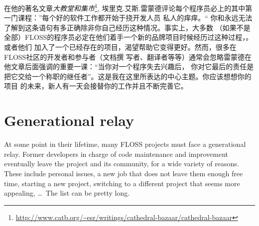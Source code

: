 

\noindent{}在他的著名文章\textit{大教堂和集市}\footnote{\url{
http://www.catb.org/~esr/writings/cathedral-bazaar/cathedral-bazaar}}, 
埃里克.艾斯.雷蒙德评论每个程序员必上的其中第一门课程：”每个好的软件工作都开始于挠开发人员
私人的痒痒。“ 你和永远无法了解到这条语句有多正确除非你自己经历这种情况。事实上，大多数
（如果不是全部）FLOSS的程序员必定在他们着手一个新的品牌项目时候经历过这种过程，。或者他们
加入了一个已经存在的项目，渴望帮助它变得更好。然而，很多在FLOSS社区的开发者和参与者（文档撰
写者、翻译者等等）通常会忽略雷蒙德在他文章后面强调的重要一课：“当你对一个程序失去兴趣后，
你对它最后的责任是把它交给一个称职的继任者”。这是我在这里所表达的中心主题。你应该想想你的项目
的未来，新人有一天会接替你的工作并且不断完善它。

\section*{Generational relay}

At some point in their lifetime, many FLOSS projects must face a generational
relay. Former developers in charge of code maintenance and improvement
eventually leave the project and its community, for a wide variety of reasons.
These include personal issues, a new job that does not leave them enough free
time, starting a new project, switching to a different project that seems more
appealing, \dots\ The list can be pretty long.

